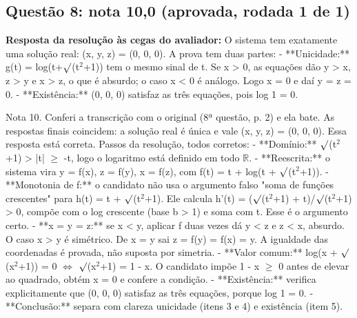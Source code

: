\documentclass{article}%
\begin{document}
\subsection*{Questão 8: nota 10,0 (aprovada, rodada 1 de 1)}%
\textbf{Resposta da resolução às cegas do avaliador:} O sistema tem exatamente uma solução real: (x, y, z) = (0, 0, 0). A prova tem duas partes:\newline%
{-} **Unicidade:** g(t) = log(t+$\surd$(t$^2$+1)) tem o mesmo sinal de t. Se x > 0, as equações dão y > x, z > y e x > z, o que é absurdo; o caso x < 0 é análogo. Logo x = 0 e daí y = z = 0.\newline%
{-} **Existência:** (0, 0, 0) satisfaz as três equações, pois log 1 = 0.\par %
Nota 10. Conferi a transcrição com o original (8ª questão, p. 2) e ela bate. As respostas finais coincidem: a solução real é única e vale (x, y, z) = (0, 0, 0). Essa resposta está correta.\newline%
\newline%
Passos da resolução, todos corretos:\newline%
{-} **Domínio:** $\surd$(t$^2$+1) > |t| $\geq$ -t, logo o logaritmo está definido em todo $\mathbb{R}$.\newline%
{-} **Reescrita:** o sistema vira y = f(x), z = f(y), x = f(z), com f(t) = t + log(t + $\surd$(t$^2$+1)).\newline%
{-} **Monotonia de f:** o candidato não usa o argumento falso "soma de funções crescentes" para h(t) = t + $\surd$(t$^2$+1). Ele calcula h'(t) = ($\surd$(t$^2$+1) + t)/$\surd$(t$^2$+1) > 0, compõe com o log crescente (base b > 1) e soma com t. Esse é o argumento certo.\newline%
{-} **x = y = z:** se x < y, aplicar f duas vezes dá y < z e z < x, absurdo. O caso x > y é simétrico. De x = y sai z = f(y) = f(x) = y. A igualdade das coordenadas é provada, não suposta por simetria.\newline%
{-} **Valor comum:** log(x + $\surd$(x$^2$+1)) = 0 $\Leftrightarrow$ $\surd$(x$^2$+1) = 1 - x. O candidato impõe 1 - x $\geq$ 0 antes de elevar ao quadrado, obtém x = 0 e confere a condição.\newline%
{-} **Existência:** verifica explicitamente que (0, 0, 0) satisfaz as três equações, porque log 1 = 0.\newline%
{-} **Conclusão:** separa com clareza unicidade (itens 3 e 4) e existência (item 5).\newline%
\newline%
\end{document}
